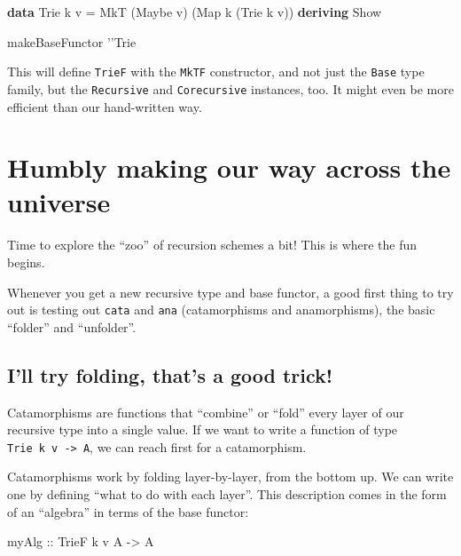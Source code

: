 \documentclass[]{article}
\newenvironment{Shaded}{}{}
\newcommand{\DataTypeTok}[1]{\textcolor[rgb]{0.56,0.13,0.00}{#1}}
\newcommand{\FunctionTok}[1]{\textcolor[rgb]{0.02,0.16,0.49}{#1}}
\newcommand{\KeywordTok}[1]{\textcolor[rgb]{0.00,0.44,0.13}{\textbf{#1}}}
\newcommand{\NormalTok}[1]{#1}
\newcommand{\OtherTok}[1]{\textcolor[rgb]{0.00,0.44,0.13}{#1}}
\begin{document}
\begin{Shaded}
\begin{Highlighting}[]
\KeywordTok{data} \DataTypeTok{Trie}\NormalTok{ k v }\FunctionTok{=} \DataTypeTok{MkT}\NormalTok{ (}\DataTypeTok{Maybe}\NormalTok{ v) (}\DataTypeTok{Map}\NormalTok{ k (}\DataTypeTok{Trie}\NormalTok{ k v))}
  \KeywordTok{deriving} \DataTypeTok{Show}

\NormalTok{makeBaseFunctor '}\DataTypeTok{'Trie}
\end{Highlighting}
\end{Shaded}

This will define \texttt{TrieF} with the \texttt{MkTF} constructor, and not just
the \texttt{Base} type family, but the \texttt{Recursive} and
\texttt{Corecursive} instances, too. It might even be more efficient than our
hand-written way.

\hypertarget{humbly-making-our-way-across-the-universe}{%
\section{Humbly making our way across the
universe}\label{humbly-making-our-way-across-the-universe}}

Time to explore the ``zoo'' of recursion schemes a bit! This is where the fun
begins.

Whenever you get a new recursive type and base functor, a good first thing to
try out is testing out \texttt{cata} and \texttt{ana} (catamorphisms and
anamorphisms), the basic ``folder'' and ``unfolder''.

\hypertarget{ill-try-folding-thats-a-good-trick}{%
\subsection{I'll try folding, that's a good
trick!}\label{ill-try-folding-thats-a-good-trick}}

Catamorphisms are functions that ``combine'' or ``fold'' every layer of our
recursive type into a single value. If we want to write a function of type
\texttt{Trie\ k\ v\ -\textgreater{}\ A}, we can reach first for a catamorphism.

Catamorphisms work by folding layer-by-layer, from the bottom up. We can write
one by defining ``what to do with each layer''. This description comes in the
form of an ``algebra'' in terms of the base functor:

\begin{Shaded}
\begin{Highlighting}[]
\OtherTok{myAlg ::} \DataTypeTok{TrieF}\NormalTok{ k v }\DataTypeTok{A} \OtherTok{->} \DataTypeTok{A}
\end{Highlighting}
\end{Shaded}
\end{document}
